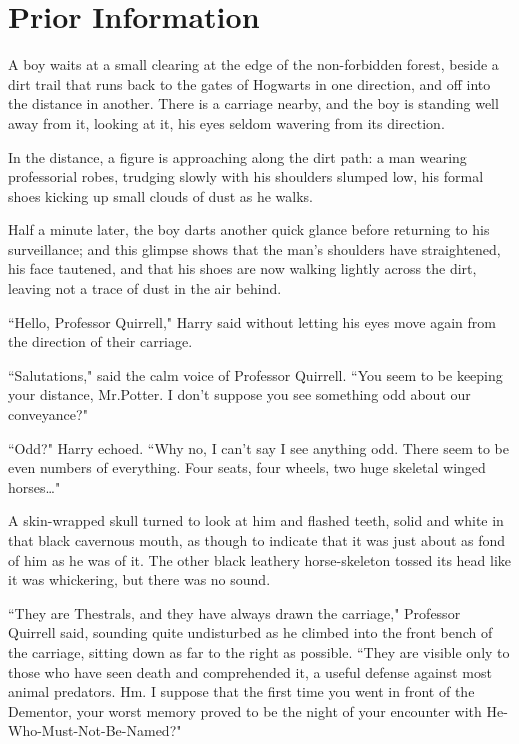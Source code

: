 \chapter{Prior Information}

\lettrine{A}{} boy waits at a small clearing at the edge of the non-forbidden forest, beside a dirt trail that runs back to the gates of Hogwarts in one direction, and off into the distance in another. There is a carriage nearby, and the boy is standing well away from it, looking at it, his eyes seldom wavering from its direction.

In the distance, a figure is approaching along the dirt path: a man wearing professorial robes, trudging slowly with his shoulders slumped low, his formal shoes kicking up small clouds of dust as he walks.

Half a minute later, the boy darts another quick glance before returning to his surveillance; and this glimpse shows that the man's shoulders have straightened, his face tautened, and that his shoes are now walking lightly across the dirt, leaving not a trace of dust in the air behind.

``Hello, Professor Quirrell," Harry said without letting his eyes move again from the direction of their carriage.

``Salutations," said the calm voice of Professor Quirrell. ``You seem to be keeping your distance, Mr.\?Potter. I don't suppose you see something odd about our conveyance?"

``Odd?" Harry echoed. ``Why no, I can't say I see anything odd. There seem to be even numbers of everything. Four seats, four wheels, two huge skeletal winged horses{\ldots}"

A skin-wrapped skull turned to look at him and flashed teeth, solid and white in that black cavernous mouth, as though to indicate that it was just about as fond of him as he was of it. The other black leathery horse-skeleton tossed its head like it was whickering, but there was no sound.

``They are Thestrals, and they have always drawn the carriage," Professor Quirrell said, sounding quite undisturbed as he climbed into the front bench of the carriage, sitting down as far to the right as possible. ``They are visible only to those who have seen death and comprehended it, a useful defense against most animal predators. Hm. I suppose that the first time you went in front of the Dementor, your worst memory proved to be the night of your encounter with He-Who-Must-Not-Be-Named?"

